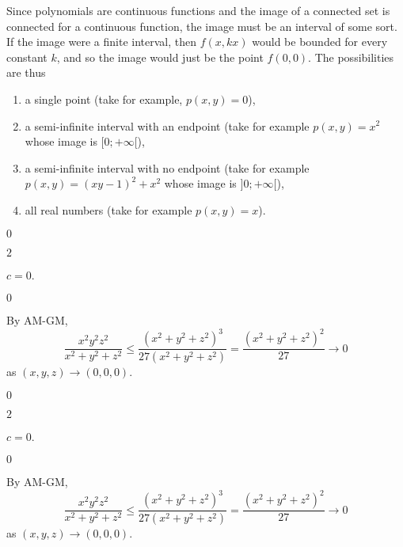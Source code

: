 \begin{Answer}{2.2}
 Since polynomials are continuous
functions and the image of a connected set is connected for a
continuous function, the image must be an interval of some sort. If
the image were a finite interval, then $f(x,kx)$ would be bounded
for every constant $k$, and so the image would just be the point
$f(0,0).$ The possibilities are thus
\begin{enumerate}\item  a single point (take for example,
$p(x,y)= 0$), \item  a semi-infinite interval with an endpoint (take
for example $p(x,y) = x^2$ whose image is $[0; +\infty[$),
\item  a semi-infinite interval with no endpoint (take for example
$p(x,y) = (xy - 1)^2 + x^2$ whose image is $]0; +\infty[$),
\item  all real numbers (take for example $p(x,y) =
x$).
\end{enumerate}
\end{Answer}
\begin{Answer}{2.8}
 $0$ 
\end{Answer}
\begin{Answer}{2.9}
 $2$ 
\end{Answer}
\begin{Answer}{2.10}
$c=0$.
\end{Answer}
\begin{Answer}{2.11}
 $0$ 
\end{Answer}
\begin{Answer}{2.14}
By AM-GM, $$\dfrac{x^2y^2z^2}{x^2+y^2+z^2} \leq
\dfrac{(x^2+y^2+z^2)^3}{27(x^2+y^2+z^2)} =
\dfrac{(x^2+y^2+z^2)^2}{27}\to 0$$ as $(x,y,z)\to (0,0,0)$.
\end{Answer}
\begin{Answer}{2.21}
 $0$ 
\end{Answer}
\begin{Answer}{2.22}
 $2$ 
\end{Answer}
\begin{Answer}{2.23}
$c=0$.
\end{Answer}
\begin{Answer}{2.24}
 $0$ 
\end{Answer}
\begin{Answer}{2.27}
By AM-GM, $$\dfrac{x^2y^2z^2}{x^2+y^2+z^2} \leq
\dfrac{(x^2+y^2+z^2)^3}{27(x^2+y^2+z^2)} =
\dfrac{(x^2+y^2+z^2)^2}{27}\to 0$$ as $(x,y,z)\to (0,0,0)$.
\end{Answer}
